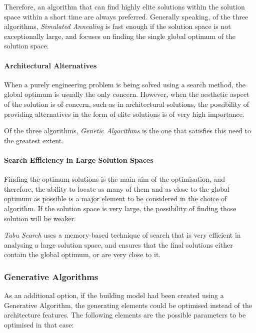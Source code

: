 Therefore, an algorithm that can find highly elite solutions within the solution space within a short time are always preferred. Generally speaking, of the three algorithms, \emph{Simulated Annealing} is fast enough if the solution space is not exceptionally large, and focuses on finding the single global optimum of the solution space.

\paragraph{Architectural Alternatives}\mbox{}\vspace{-0.4cm}

When a purely engineering problem is being solved using a search method, the global optimum is usually the only concern. However, when the aesthetic aspect of the solution is of concern, such as in architectural solutions, the possibility of providing alternatives in the form of elite solutions is of very high importance.

Of the three algorithms, \emph{Genetic Algorithms} is the one that satisfies this need to the greatest extent.

\paragraph{Search Efficiency in Large Solution Spaces}\mbox{}\vspace{-0.4cm}

Finding the optimum solutions is the main aim of the optimisation, and therefore, the ability to locate as many of them and as close to the global optimum as possible is a major element to be considered in the choice of algorithm. If the solution space is very large, the possibility of finding those solution will be weaker.

\emph{Tabu Search} uses a memory-based technique of search that is very efficient in analysing a large solution space, and ensures that the final solutions either contain the global optimum, or are very close to it.



\subsubsection{Generative Algorithms}

As an additional option, if the building model had been created using a Generative Algorithm, the generating elements could be optimised instead of the architecture features. The following elements are the possible parameters to be optimised in that case:


